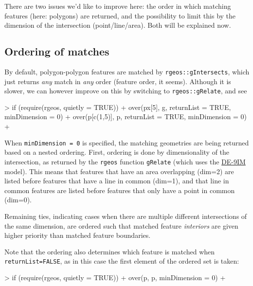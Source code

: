 \documentclass{article}
\newcommand{\code}[1]{{\tt #1}}
\begin{document}
There are two issues we'd like to improve here: the order in
which matching features (here: polygons) are returned, and the
possibility to limit this by the dimension of the intersection
(point/line/area). Both will be explained now.

\subsection{Ordering of matches}

By default, polygon-polygon features are matched by
\code{rgeos::gIntersects}, which just returns {\em any} match in
{\em any} order (feature order, it seems). Although it is slower,
we  can however improve on this by switching to \code{rgeos::gRelate}, and see
\begin{Schunk}
\begin{Sinput}
> if (require(rgeos, quietly = TRUE)) {
+ over(px[5], g, returnList = TRUE, minDimension = 0)
+ over(p[c(1,5)], p, returnList = TRUE, minDimension = 0)
+ }
\end{Sinput}
\end{Schunk}
When \code{minDimension = 0} is specified, the matching geometries
are being returned based on a nested ordering. First, ordering
is done by dimensionality of the intersection, as returned
by the \code{rgeos} function \code{gRelate} (which uses the
\href{https://en.wikipedia.org/wiki/DE-9IM}{DE-9IM} model).
This means that features that have an area overlapping (dim=2)
are listed before features that have a line in common (dim=1),
and that line in common features are listed before features that
only have a point in common (dim=0).

Remaining ties, indicating cases when there are multiple different
intersections of the same dimension, are ordered such that matched
feature {\em interiors} are given higher priority than matched
feature boundaries.

Note that the ordering also determines which feature is matched
when \code{returnList=FALSE}, as in this case the first element of
the ordered set is taken:
\begin{Schunk}
\begin{Sinput}
> if (require(rgeos, quietly = TRUE)) {
+ over(p, p, minDimension = 0)
+ }
\end{Sinput}
\end{Schunk}
\end{document}
